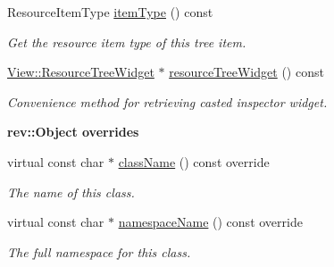 \begin{Indent}
\begin{DoxyCompactItemize}
Resource\+Item\+Type \mbox{\hyperlink{classrev_1_1_view_1_1_resource_item_a6b42cb2befbe8779b1f77e4b74e7c78d}{item\+Type}} () const
\begin{DoxyCompactList}\small\item\em Get the resource item type of this tree item. \end{DoxyCompactList}\item 
\mbox{\label{classrev_1_1_view_1_1_resource_item_ad604e34c293e888280ba760ccfa7098f}} 
\mbox{\hyperlink{classrev_1_1_view_1_1_resource_tree_widget}{View\+::\+Resource\+Tree\+Widget}} $\ast$ \mbox{\hyperlink{classrev_1_1_view_1_1_resource_item_ad604e34c293e888280ba760ccfa7098f}{resource\+Tree\+Widget}} () const
\begin{DoxyCompactList}\small\item\em Convenience method for retrieving casted inspector widget. \end{DoxyCompactList}\end{DoxyCompactItemize}
\end{Indent}
\begin{Indent}\textbf{ rev\+::Object overrides}\par
\begin{DoxyCompactItemize}
\item 
virtual const char $\ast$ \mbox{\hyperlink{classrev_1_1_view_1_1_resource_item_ab53eb0848ac7e530ad5dc8220bf8609a}{class\+Name}} () const override
\begin{DoxyCompactList}\small\item\em The name of this class. \end{DoxyCompactList}\item 
virtual const char $\ast$ \mbox{\hyperlink{classrev_1_1_view_1_1_resource_item_a15af214f49adc7e9e793a0a1d43a4e60}{namespace\+Name}} () const override
\begin{DoxyCompactList}\small\item\em The full namespace for this class. \end{DoxyCompactList}\end{DoxyCompactItemize}
\end{Indent}
